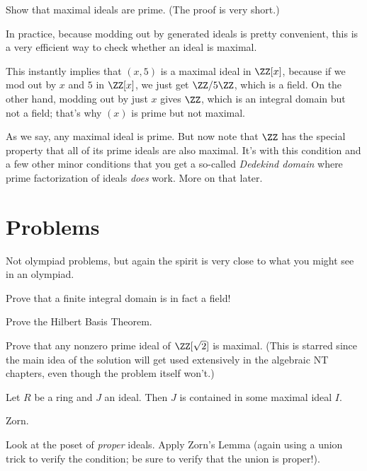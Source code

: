 \begin{ques}
	Show that maximal ideals are prime.
	(The proof is very short.)
\end{ques}

In practice, because modding out by generated ideals is pretty convenient,
this is a very efficient way to check whether an ideal is maximal.
\begin{example}
	\listhack
	\begin{enumerate}[(a)]
		\ii This instantly implies that $(x,5)$ is a maximal ideal
		in $\ZZ[x]$, because if we mod out by $x$ and $5$ in $\ZZ[x]$,
		we just get $\ZZ/5\ZZ$, which is a field.
		\ii On the other hand, modding out by just $x$ gives $\ZZ$,
		which is an integral domain but not a field; that's why $(x)$ is
		prime but not maximal.
	\end{enumerate}
\end{example}

As we say, any maximal ideal is prime.
But now note that $\ZZ$ has the special property that
all of its prime ideals are also maximal.
It's with this condition and a few other minor conditions
that you get a so-called \emph{Dedekind domain}
where prime factorization of ideals \emph{does} work.
More on that later.

\section{Problems}
Not olympiad problems, but again the spirit is very close
to what you might see in an olympiad.

\begin{sproblem}
	Prove that a finite integral domain is in fact a field!
	\label{prob:finite_domain_field}
\end{sproblem}
\begin{problem}
	Prove the Hilbert Basis Theorem.
\end{problem}
\begin{sproblem}
	Prove that any nonzero prime ideal of $\ZZ[\sqrt 2]$ is maximal.
	(This is starred since the main idea of the solution will get used extensively in
	the algebraic NT chapters, even though the problem itself won't.)
	\label{prob:dedekind_sample}
\end{sproblem}

\begin{problem}
	Let $R$ be a ring and $J$ an ideal.
	Then $J$ is contained in some maximal ideal $I$.
	\begin{hint}
		Zorn.
	\end{hint}
	\begin{sol}
		Look at the poset of \emph{proper} ideals.
		Apply Zorn's Lemma (again using a union trick to verify the condition;
		be sure to verify that the union is proper!).
	\end{sol}
\end{problem}

